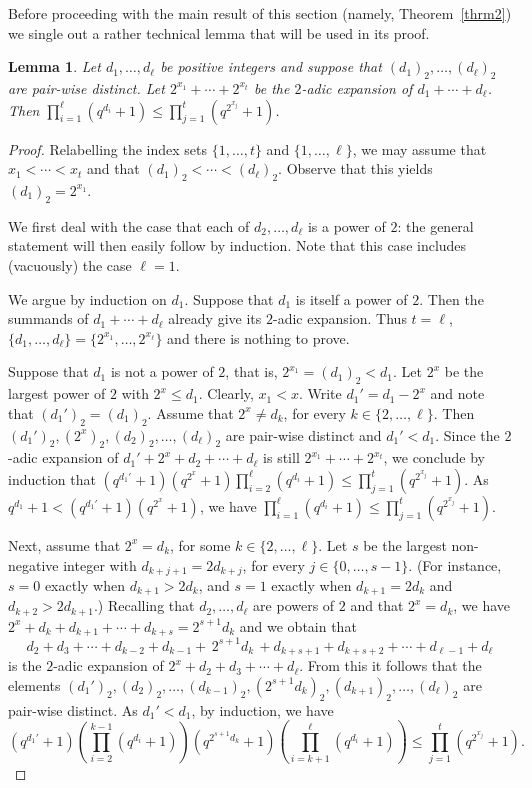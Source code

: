 \documentclass{amsart}
\newtheorem{lemma}[theorem]{Lemma}
\begin{document}
Before proceeding with the main result of this section (namely, Theorem~\ref{thrm2}) we single out a rather technical lemma that will be used in its proof.
\begin{lemma}\label{babylonians}
Let $d_1,\ldots,d_\ell$ be positive integers and suppose that $(d_1)_2,\ldots,(d_\ell)_2$ are pair-wise distinct. Let $2^{x_1}+\cdots+2^{x_t}$ be the $2$-adic expansion of $d_1+\cdots +d_\ell$. Then $\prod_{i=1}^\ell(q^{d_i}+1)\leq\prod_{j=1}^t(q^{2^{x_j}}+1)$.
\end{lemma}
\begin{proof}
Relabelling the index sets $\{1,\ldots,t\}$ and $\{1,\ldots,\ell\}$, we may assume that $x_1<\cdots <x_t$ and that $(d_1)_2<\cdots <(d_\ell)_2$. Observe that this yields $(d_1)_2=2^{x_1}$.

We first deal with the case that each of $d_2,\ldots,d_\ell$ is a power of $2$: the general statement will then easily follow by induction. Note that this case includes (vacuously) the case $\ell=1$. 

We argue by induction on $d_1$. Suppose that  $d_1$ is itself a power of $2$. Then the summands of $d_1+\cdots+d_\ell$ already give its $2$-adic expansion. Thus $t=\ell$, $\{d_1,\ldots,d_\ell\}=\{2^{x_1},\ldots,2^{x_\ell}\}$ and there is nothing to prove. 

Suppose that $d_1$ is not a power of $2$, that is, $2^{x_1}=(d_1)_2<d_1$. Let $2^x$ be the largest power of $2$ with $2^x\leq d_1$. Clearly, $x_1<x$. Write $d_1'=d_1-2^x$ and note that $(d_1')_2=(d_1)_2$. Assume that $2^x\neq d_k$, for every $k\in \{2,\ldots,\ell\}$. Then  $(d_1')_2,(2^x)_2,(d_2)_2,\ldots,(d_\ell)_2$ are pair-wise distinct and $d_1'<d_1$. Since the $2$-adic expansion of $d_1'+2^x+d_2+\cdots+d_\ell$ is still $2^{x_1}+\cdots +2^{x_t}$, we conclude  by induction that $(q^{d_1'}+1)(q^{2^x}+1)\prod_{i=2}^\ell(q^{d_i}+1)\leq \prod_{j=1}^t(q^{2^{x_j}}+1)$. As $q^{d_1}+1<(q^{d_1'}+1)(q^{2^x}+1)$, we have $\prod_{i=1}^\ell(q^{d_i}+1)\leq\prod_{j=1}^t(q^{2^{x_j}}+1)$. 

Next, assume that $2^x=d_k$, for some $k\in \{2,\ldots,\ell\}$.
Let $s$ be the largest non-negative integer with $d_{k+j+1}=2d_{k+j}$, for every $j\in \{0,\ldots,s-1\}$. (For instance, $s=0$ exactly when $d_{k+1}>2d_k$, and $s=1$ exactly when $d_{k+1}=2d_k$ and $d_{k+2}>2d_{k+1}$.) Recalling that $d_2,\ldots,d_\ell$ are powers of $2$ and that $2^x=d_k$, we have $2^x+d_k+d_{k+1}+\cdots+d_{k+s}=2^{s+1}d_k$ and we obtain that 
$$d_2+d_3+\cdots +d_{k-2}+d_{k-1}+\, 2^{s+1}d_k\,+d_{k+s+1}+d_{k+s+2}+\cdots+d_{\ell-1} +d_\ell$$
is the $2$-adic expansion of $2^x+d_2+d_3+\cdots +d_\ell$. 
From this it follows that the elements
$(d_1')_2,(d_2)_2,\ldots,(d_{k-1})_2,(2^{s+1}d_k)_2,(d_{k+1})_2,\ldots,(d_\ell)_2$ are pair-wise distinct. As $d_1'<d_1$, by induction, we have
\begin{equation}\label{hard2}
(q^{d_1'}+1)
\left(
\prod_{i=2}^{k-1}
(q^{d_i}+1)
\right)
(q^{2^{s+1}d_k}+1)
\left(\prod_{i=k+1}^\ell(q^{d_i}+1)\right)\leq \prod_{j=1}^t(q^{2^{x_j}}+1).
\end{equation}


\end{proof}
\end{document}
